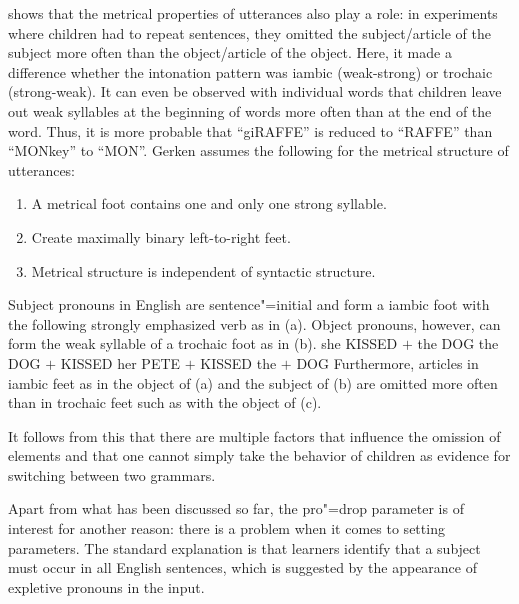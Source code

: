 \citet{Gerken91a} shows that the metrical properties of utterances also play a role: in experiments where children had to repeat sentences,
they omitted the subject/article of the subject more often  than the object/article of the object. Here, it made a difference whether the intonation pattern
was iambic (weak-strong) or trochaic (strong-weak). It can even be observed with individual words that children leave out
weak syllables at the beginning of words more often than at the end of the word. Thus, it is more probable that ``giRAFFE'' is reduced to ``RAFFE'' than
``MONkey'' to ``MON''. Gerken assumes the following for the metrical structure of utterances:
\begin{enumerate}
\item A metrical foot contains one and only one strong syllable.
\item Create maximally binary left-to-right feet.
\item Metrical structure is independent of syntactic structure.
\end{enumerate}
Subject pronouns in English are sentence"=initial and form a iambic foot with the following strongly emphasized verb as in (a).
Object pronouns, however, can form the weak syllable of a trochaic foot as in (b). 
\eal
\ex she KISSED $+$ the DOG
\ex the DOG $+$ KISSED her
\ex PETE $+$ KISSED the $+$ DOG
\zl
Furthermore, articles in iambic feet as in the object of (a) and the subject of (b) are omitted more often
than in trochaic feet such as with the object of (c).

It follows from this that there are multiple factors that influence the omission of elements and that one cannot simply take the behavior
of children as evidence for switching between two grammars.

Apart from what has been discussed so far, the pro"=drop parameter is of interest for another reason: there is a problem when it comes to setting parameters. The standard explanation is
that learners identify that a subject must occur in all English sentences, which is suggested by the appearance of expletive pronouns in 
the input.

